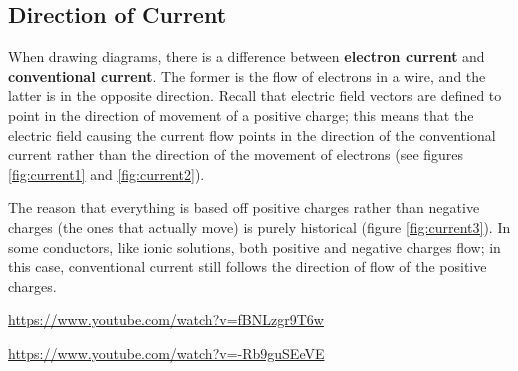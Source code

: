 \documentclass[a4paper]{amsbook}
\begin{document}
\subsection{Direction of Current}
When drawing diagrams, there is a difference between \textbf{electron current} and \textbf{conventional current}.
The former is the flow of electrons in a wire, and the latter is in the opposite direction. Recall that electric
field vectors are defined to point in the direction of movement of a positive charge; this means that the electric
field causing the current flow points in the direction of the conventional current rather than the direction of the
movement of electrons (see figures \ref{fig:current1} and \ref{fig:current2}).

The reason that everything is based off positive charges rather than negative charges (the ones that actually move)
is purely historical (figure \ref{fig:current3}). In some conductors, like ionic solutions, both positive and negative
charges flow; in this case, conventional current still follows the direction of flow of the positive charges.

\begin{center}
\begin{tcolorbox}[width=0.8\textwidth,colback={red},title={\textbf{Go and watch...}},colbacktitle=yellow,coltitle=blue]
  \textcolor{white}{\url{https://www.youtube.com/watch?v=fBNLzgr9T6w}}
\end{tcolorbox}
\end{center}

\begin{center}
\begin{tcolorbox}[width=0.8\textwidth,colback={red},title={\textbf{Go and watch...}},colbacktitle=yellow,coltitle=blue]
  \textcolor{white}{\url{https://www.youtube.com/watch?v=-Rb9guSEeVE}}
\end{tcolorbox}
\end{center}
\end{document}
